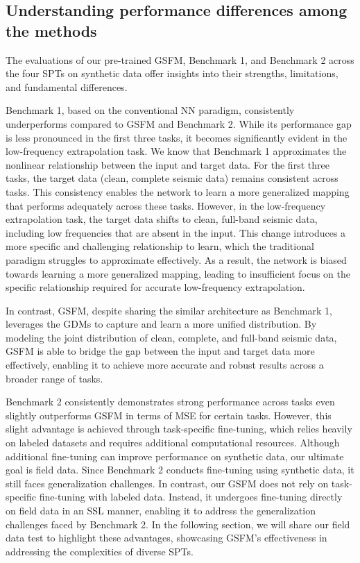 \subsection{Understanding performance differences among the methods}
The evaluations of our pre-trained GSFM, Benchmark 1, and Benchmark 2 across the four SPTs on synthetic data offer insights into their strengths, limitations, and fundamental differences. 

Benchmark 1, based on the conventional NN paradigm, consistently underperforms compared to GSFM and Benchmark 2. While its performance gap is less pronounced in the first three tasks, it becomes significantly evident in the low-frequency extrapolation task. We know that Benchmark 1 approximates the nonlinear relationship between the input and target data. For the first three tasks, the target data (clean, complete seismic data) remains consistent across tasks. This consistency enables the network to learn a more generalized mapping that performs adequately across these tasks. However, in the low-frequency extrapolation task, the target data shifts to clean, full-band seismic data, including low frequencies that are absent in the input. This change introduces a more specific and challenging relationship to learn, which the traditional paradigm struggles to approximate effectively. As a result, the network is biased towards learning a more generalized mapping, leading to insufficient focus on the specific relationship required for accurate low-frequency extrapolation. 

In contrast, GSFM, despite sharing the similar architecture as Benchmark 1, leverages the GDMs to capture and learn a more unified distribution. By modeling the joint distribution of clean, complete, and full-band seismic data, GSFM is able to bridge the gap between the input and target data more effectively, enabling it to achieve more accurate and robust results across a broader range of tasks. 

Benchmark 2 consistently demonstrates strong performance across tasks even slightly outperforms GSFM in terms of MSE for certain tasks. However, this slight advantage is achieved through task-specific fine-tuning, which relies heavily on labeled datasets and requires additional computational resources. Although additional fine-tuning can improve performance on synthetic data, our ultimate goal is field data. Since Benchmark 2 conducts fine-tuning using synthetic data, it still faces generalization challenges. In contrast, our GSFM does not rely on task-specific fine-tuning with labeled data. Instead, it undergoes fine-tuning directly on field data in an SSL manner, enabling it to address the generalization challenges faced by Benchmark 2. In the following section, we will share our field data test to highlight these advantages, showcasing GSFM’s effectiveness in addressing the complexities of diverse SPTs. 

